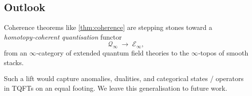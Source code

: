 \vspace{0.5cm}
\subsection{Outlook}

Coherence theorems like \ref{thm:coherence} are stepping stones toward a
\emph{homotopy‑coherent quantisation} functor
\[ \mathcal Q_\infty \;\longrightarrow\; \mathcal E_\infty, \]
from an $\infty$‑category of extended quantum field theories to the
$\infty$‑topos of smooth stacks.

Such a lift would capture anomalies, dualities, and
categorical states / operators in TQFTs on an equal footing.
We leave this generalisation to future work.